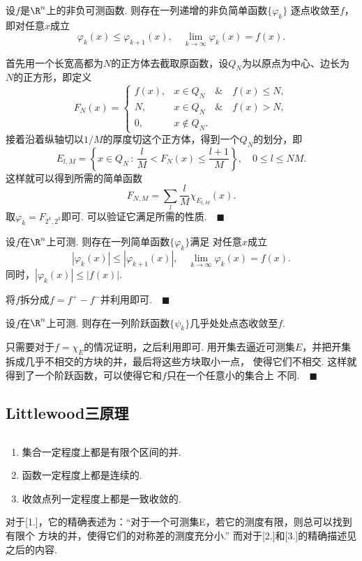   \begin{thm}
    \label{thm: 简单函数逼近非负可测函数}
    设$f$是$\R^n$上的非负可测函数. 则存在一列递增的非负简单函数$\{\varphi_k\}$
    逐点收敛至$f$，即对任意$x$成立
    \[
      \varphi_k(x) \le \varphi_{k+1}(x),\quad
      \lim_{k\to\infty}\varphi_k(x) = f(x).
    \]
  \end{thm}
  \proof
    首先用一个长宽高都为$N$的正方体去截取原函数，设$Q_N$为以原点为中心、边长为
    $N$的正方形，即定义
    \[
      F_N(x) = \begin{cases}
        f(x), & x \in Q_N\quad\text{\&}\quad f(x) \le N, \\
        N,    & x \in Q_N\quad\text{\&}\quad f(x) > N, \\
        0,    & x \notin Q_N.
      \end{cases}
    \]
    接着沿着纵轴切以$1/M$的厚度切这个正方体，得到一个$Q_N$的划分，即
    \[
      E_{l,M} = \left\{ x\in Q_N \,:\,
      \frac{l}{M} < F_N(x) \le \frac{l+1}{M} \right\}, \quad
      0\le l \le NM.
    \]
    这样就可以得到所需的简单函数
    \[
      F_{N, M} = \sum_{l}\frac{l}{M}\chi_{E_{l,M}}(x).
    \]
    取$\varphi_k = F_{2^k,2^k}$即可. 可以验证它满足所需的性质.$\quad\blacksquare$

  \begin{thm}
    \label{thm: 简单函数逼近可测函数}
    设$f$在$\R^n$上可测. 则存在一列简单函数$\{\varphi_k\}$满足
    对任意$x$成立
    \[
      |\varphi_k(x)| \le |\varphi_{k+1}(x)|,\quad
      \lim_{k\to\infty}\varphi_k(x) = f(x).
    \]
    同时，$|\varphi_k(x)| \le |f(x)|$.
  \end{thm}
  \proof
    将$f$拆分成$f=f^+-f^-$并利用即可.$\quad\blacksquare$

  \begin{thm}
    \label{thm: 阶跃函数逼近可测函数}
    设$f$在$\R^n$上可测. 则存在一列阶跃函数$\{\psi_k\}$几乎处处点态收敛至$f$.
  \end{thm}
  \proof
    只需要对于$f=\chi_E$的情况证明，之后利用即可.
    用开集去逼近可测集$E$，并把开集拆成几乎不相交的方块的并，最后将这些方块取小一点，
    使得它们不相交. 这样就得到了一个阶跃函数，可以使得它和$f$只在一个任意小的集合上
    不同.$\quad\blacksquare$



\subsection{Littlewood三原理}
  \begin{pos}[Littlewood]
    $\,$
    \begin{enumerate}
      \item 集合一定程度上都是有限个区间的并.
      \item 函数一定程度上都是连续的.
      \item 收敛点列一定程度上都是一致收敛的.
    \end{enumerate}
  \end{pos}
  \remark
    对于[1.]，它的精确表述为：“对于一个可测集E，若它的测度有限，则总可以找到有限个
    方块的并，使得它们的对称差的测度充分小.” 而对于[2.]和[3.]的精确描述见之后的内容.

